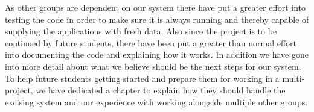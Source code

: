 As other groups are dependent on our system there have put a greater effort into testing the code in order to make sure it is always running and thereby capable of supplying the applications with fresh data.
Also since the project is to be continued by future students, there have been put a greater than normal effort into documenting the code and explaining how it works. In addition we have gone into more detail about what we believe should be the next steps for our system.
To help future students getting started and prepare them for working in a multi-project, we have dedicated a chapter to explain how they should handle the excising system and our experience with working alongside multiple other groups. 